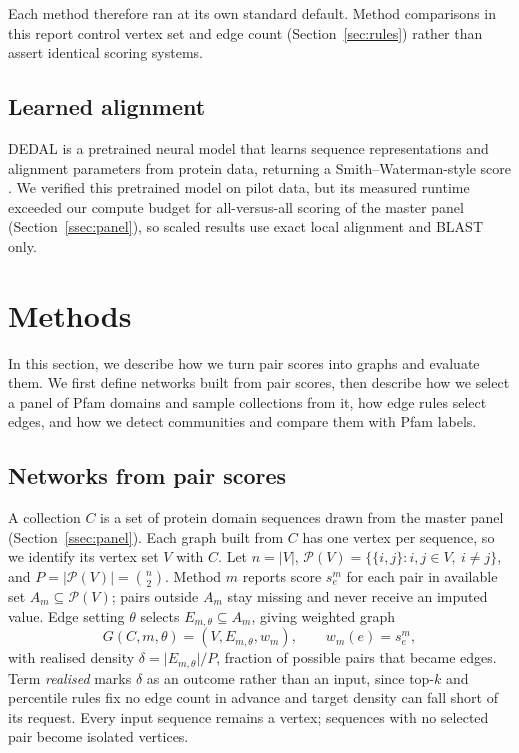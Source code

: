 \documentclass[11pt,a4paper]{article}
\begin{document}
Each method therefore ran at its own standard default. Method comparisons in
this report control vertex set and edge count (Section~\ref{sec:rules}) rather
than assert identical scoring systems.

\subsection{Learned alignment}

DEDAL is a pretrained neural model that learns sequence representations and
alignment parameters from protein data, returning a Smith--Waterman-style score
\citep{llinareslopez2023deep}. We verified this pretrained model on pilot data,
but its measured runtime exceeded our compute budget for all-versus-all scoring
of the master panel (Section~\ref{ssec:panel}), so scaled results use exact
local alignment and BLAST only.

\section{Methods}

In this section, we describe how we turn pair scores into graphs and evaluate
them. We first define networks built from pair scores, then describe how we
select a panel of Pfam domains and sample collections from it, how edge rules
select edges, and how we detect communities and compare them with Pfam labels.

\subsection{Networks from pair scores}

A collection \(C\) is a set of protein domain sequences drawn from the master
panel (Section~\ref{ssec:panel}). Each graph built from \(C\) has one vertex
per sequence, so we identify its vertex set \(V\) with \(C\). Let \(n=\lvert V\rvert\),
\(\mathcal P(V)=\{\{i,j\}:i,j\in V,\ i\neq j\}\), and
\(P=\lvert\mathcal P(V)\rvert=\binom n2\). Method \(m\) reports score
\(s_e^m\) for each pair in available set \(A_m\subseteq\mathcal P(V)\); pairs
outside \(A_m\) stay missing and never receive an imputed value. Edge setting
\(\theta\) selects \(E_{m,\theta}\subseteq A_m\), giving weighted graph
\[
G(C,m,\theta)=(V,E_{m,\theta},w_m),\qquad w_m(e)=s_e^m,
\]
with realised density \(\delta=\lvert E_{m,\theta}\rvert/P\), fraction of
possible pairs that became edges. Term \emph{realised} marks \(\delta\) as an
outcome rather than an input, since top-\(k\) and percentile rules fix no edge
count in advance and target density can fall short of its request. Every input
sequence remains a vertex; sequences with no selected pair become isolated vertices.
\end{document}
